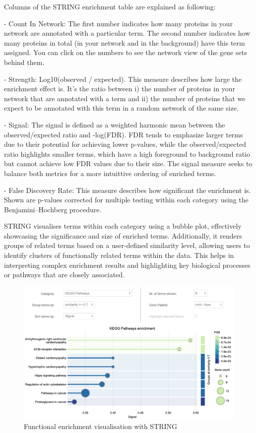 \documentclass[
]{book}
\begin{document}
Columns of the STRING enrichment table are explained as following:

{- Count In Network:}
The first number indicates how many proteins in your network are annotated with a particular term. The second number indicates how many proteins in total (in your network and in the background) have this term assigned. You can click on the numbers to see the network view of the gene sets behind them.

{- Strength:}
Log10(observed / expected). This measure describes how large the enrichment effect is. It's the ratio between i) the number of proteins in your network that are annotated with a term and ii) the number of proteins that we expect to be annotated with this term in a random network of the same size.

{- Signal:}
The signal is defined as a weighted harmonic mean between the observed/expected ratio and -log(FDR). FDR tends to emphasize larger terms due to their potential for achieving lower p-values, while the observed/expected ratio highlights smaller terms, which have a high foreground to background ratio but cannot achieve low FDR values due to their size. The signal measure seeks to balance both metrics for a more intuittive ordering of enriched terms.

{- False Discovery Rate:}
This measure describes how significant the enrichment is. Shown are p-values corrected for multiple testing within each category using the Benjamini--Hochberg procedure.

STRING visualises terms within each category using a bubble plot, effectively showcasing the significance and size of enriched terms. Additionally, it renders groups of related terms based on a user-defined similarity level, allowing users to identify clusters of functionally related terms within the data. This helps in interpreting complex enrichment results and highlighting key biological processes or pathways that are closely associated.

\begin{figure}

{\centering \includegraphics[width=1\linewidth]{images/string-enrichment_KEGG_sim0.7_graph_plus} 

}

\caption{Functional enrichment visualisation with STRING}\label{fig:unnamed-chunk-20}
\end{figure}
\end{document}
